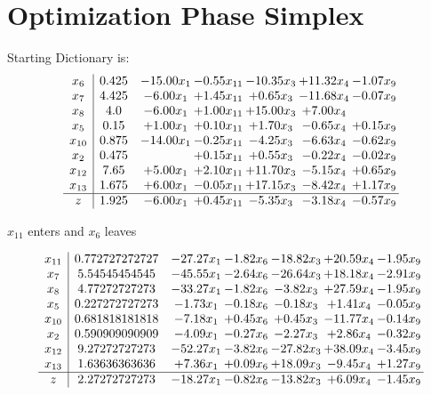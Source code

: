 \documentclass[9pt]{article}
\begin{document}
\section{Optimization Phase Simplex}
Starting Dictionary is:
\[\begin{array}{c| c c@{\hskip 2pt} c@{\hskip 2pt} c@{\hskip 2pt} c@{\hskip 2pt} c@{\hskip 2pt} }
 x_{6}   &  0.425 & -15.00 x_{1} & -0.55 x_{11} & -10.35 x_{3} & + 11.32 x_{4} & -1.07 x_{9}\\
 x_{7}   &  4.425 & -6.00 x_{1} & +  1.45 x_{11} & +  0.65 x_{3} & -11.68 x_{4} & -0.07 x_{9}\\
 x_{8}   &  4.0 & -6.00 x_{1} & +  1.00 x_{11} & + 15.00 x_{3} & +  7.00 x_{4} &   \\
 x_{5}   &  0.15 & +  1.00 x_{1} & +  0.10 x_{11} & +  1.70 x_{3} & -0.65 x_{4} & +  0.15 x_{9}\\
 x_{10}   &  0.875 & -14.00 x_{1} & -0.25 x_{11} & -4.25 x_{3} & -6.63 x_{4} & -0.62 x_{9}\\
 x_{2}   &  0.475  &   & +  0.15 x_{11} & +  0.55 x_{3} & -0.22 x_{4} & -0.02 x_{9}\\
 x_{12}   &  7.65 & +  5.00 x_{1} & +  2.10 x_{11} & + 11.70 x_{3} & -5.15 x_{4} & +  0.65 x_{9}\\
 x_{13}   &  1.675 & +  6.00 x_{1} & -0.05 x_{11} & + 17.15 x_{3} & -8.42 x_{4} & +  1.17 x_{9}\\
\hline
z    &  1.925 & -6.00 x_{1} & +  0.45 x_{11} & -5.35 x_{3} & -3.18 x_{4} & -0.57 x_{9}\\
\end{array}\]


 $ x_{11} $ enters and $ x_{6} $ leaves 

 \[\begin{array}{c| c c@{\hskip 2pt} c@{\hskip 2pt} c@{\hskip 2pt} c@{\hskip 2pt} c@{\hskip 2pt} }
 x_{11}   &  0.772727272727 & -27.27 x_{1} & -1.82 x_{6} & -18.82 x_{3} & + 20.59 x_{4} & -1.95 x_{9}\\
 x_{7}   &  5.54545454545 & -45.55 x_{1} & -2.64 x_{6} & -26.64 x_{3} & + 18.18 x_{4} & -2.91 x_{9}\\
 x_{8}   &  4.77272727273 & -33.27 x_{1} & -1.82 x_{6} & -3.82 x_{3} & + 27.59 x_{4} & -1.95 x_{9}\\
 x_{5}   &  0.227272727273 & -1.73 x_{1} & -0.18 x_{6} & -0.18 x_{3} & +  1.41 x_{4} & -0.05 x_{9}\\
 x_{10}   &  0.681818181818 & -7.18 x_{1} & +  0.45 x_{6} & +  0.45 x_{3} & -11.77 x_{4} & -0.14 x_{9}\\
 x_{2}   &  0.590909090909 & -4.09 x_{1} & -0.27 x_{6} & -2.27 x_{3} & +  2.86 x_{4} & -0.32 x_{9}\\
 x_{12}   &  9.27272727273 & -52.27 x_{1} & -3.82 x_{6} & -27.82 x_{3} & + 38.09 x_{4} & -3.45 x_{9}\\
 x_{13}   &  1.63636363636 & +  7.36 x_{1} & +  0.09 x_{6} & + 18.09 x_{3} & -9.45 x_{4} & +  1.27 x_{9}\\
\hline
z    &  2.27272727273 & -18.27 x_{1} & -0.82 x_{6} & -13.82 x_{3} & +  6.09 x_{4} & -1.45 x_{9}\\
\end{array}\]
\end{document}
